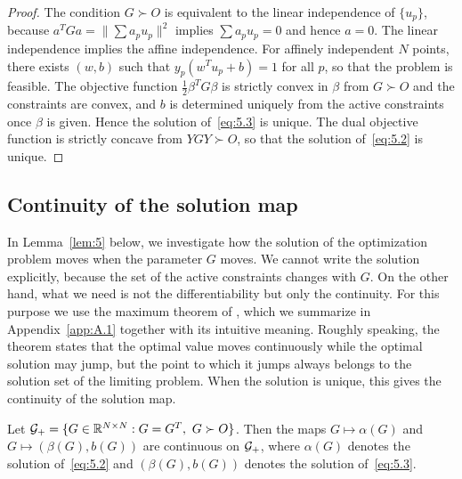 \begin{proof}
The condition $G\succ O$ is equivalent to the linear independence of $\{u_p\}$,
because $a^TGa=\|\sum a_p u_p\|^2$ implies $\sum a_p u_p=0$ and hence $a=0$. The
linear independence implies the affine independence. For affinely independent $N$
points, there exists $(w,b)$ such that $y_p(w^Tu_p+b)=1$ for all $p$, so that the
problem is feasible. The objective function $\tfrac12\beta^TG\beta$ is strictly
convex in $\beta$ from $G\succ O$ and the constraints are convex, and $b$ is
determined uniquely from the active constraints once $\beta$ is given. Hence the
solution of~\eqref{eq:5.3} is unique. The dual objective function is strictly
concave from $YGY\succ O$, so that the solution of~\eqref{eq:5.2} is unique.
\end{proof}

\subsection{Continuity of the solution map}

In Lemma~\ref{lem:5} below, we investigate how the solution of the optimization
problem moves when the parameter $G$ moves. We cannot write the solution
explicitly, because the set of the active constraints changes with $G$. On the
other hand, what we need is not the differentiability but only the continuity. For
this purpose we use the maximum theorem of \citet{berge1963}, which we summarize
in Appendix~\ref{app:A.1} together with its intuitive meaning. Roughly speaking,
the theorem states that the optimal value moves continuously while the optimal
solution may jump, but the point to which it jumps always belongs to the solution
set of the limiting problem. When the solution is unique, this gives the continuity
of the solution map.

\begin{lemma}
\label{lem:5}
Let $\mathcal{G}_+=\{G\in\mathbb{R}^{N\times N}:G=G^T,\ G\succ O\}$. Then the maps
$G\mapsto\alpha(G)$ and $G\mapsto(\beta(G),b(G))$ are continuous on $\mathcal{G}_+$,
where $\alpha(G)$ denotes the solution of~\eqref{eq:5.2} and $(\beta(G),b(G))$
denotes the solution of~\eqref{eq:5.3}.
\end{lemma}

